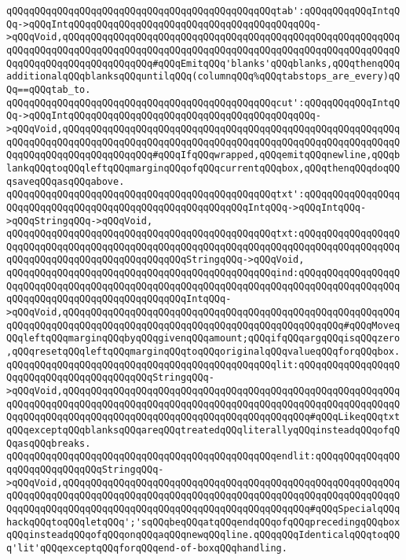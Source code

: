 \newline
\verb|qQQqqQQqqQQqqQQqqQQqqQQqqQQqqQQqqQQqqQQqqQQqqQQqtab':qQQqqQQqqQQqIntqQQq->qQQqIntqQQqqQQqqQQqqQQqqQQqqQQqqQQqqQQqqQQqqQQqqQQq->qQQqVoid,qQQqqQQqqQQqqQQqqQQqqQQqqQQqqQQqqQQqqQQqqQQqqQQqqQQqqQQqqQQqqQQqqQQqqQQqqQQqqQQqqQQqqQQqqQQqqQQqqQQqqQQqqQQqqQQqqQQqqQQqqQQqqQQqqQQqqQQqqQQqqQQqqQQqqQQqqQQq#qQQqEmitqQQq'blanks'qQQqblanks,qQQqthenqQQqadditionalqQQqblanksqQQquntilqQQq(columnqQQq%qQQqtabstops_are_every)qQQq==qQQqtab_to.|\newline
\verb|qQQqqQQqqQQqqQQqqQQqqQQqqQQqqQQqqQQqqQQqqQQqqQQqcut':qQQqqQQqqQQqIntqQQq->qQQqIntqQQqqQQqqQQqqQQqqQQqqQQqqQQqqQQqqQQqqQQqqQQq->qQQqVoid,qQQqqQQqqQQqqQQqqQQqqQQqqQQqqQQqqQQqqQQqqQQqqQQqqQQqqQQqqQQqqQQqqQQqqQQqqQQqqQQqqQQqqQQqqQQqqQQqqQQqqQQqqQQqqQQqqQQqqQQqqQQqqQQqqQQqqQQqqQQqqQQqqQQqqQQqqQQq#qQQqIfqQQqwrapped,qQQqemitqQQqnewline,qQQqblankqQQqtoqQQqleftqQQqmarginqQQqofqQQqcurrentqQQqbox,qQQqthenqQQqdoqQQqsaveqQQqasqQQqabove.|\newline
\newline
\verb|qQQqqQQqqQQqqQQqqQQqqQQqqQQqqQQqqQQqqQQqqQQqqQQqtxt':qQQqqQQqqQQqqQQqqQQqqQQqqQQqqQQqqQQqqQQqqQQqqQQqqQQqqQQqqQQqIntqQQq->qQQqIntqQQq->qQQqStringqQQq->qQQqVoid,|\newline
\verb|qQQqqQQqqQQqqQQqqQQqqQQqqQQqqQQqqQQqqQQqqQQqqQQqtxt:qQQqqQQqqQQqqQQqqQQqqQQqqQQqqQQqqQQqqQQqqQQqqQQqqQQqqQQqqQQqqQQqqQQqqQQqqQQqqQQqqQQqqQQqqQQqqQQqqQQqqQQqqQQqqQQqqQQqqQQqStringqQQq->qQQqVoid,|\newline
\newline
\verb|qQQqqQQqqQQqqQQqqQQqqQQqqQQqqQQqqQQqqQQqqQQqqQQqind:qQQqqQQqqQQqqQQqqQQqqQQqqQQqqQQqqQQqqQQqqQQqqQQqqQQqqQQqqQQqqQQqqQQqqQQqqQQqqQQqqQQqqQQqqQQqqQQqqQQqqQQqqQQqqQQqqQQqqQQqIntqQQq->qQQqVoid,qQQqqQQqqQQqqQQqqQQqqQQqqQQqqQQqqQQqqQQqqQQqqQQqqQQqqQQqqQQqqQQqqQQqqQQqqQQqqQQqqQQqqQQqqQQqqQQqqQQqqQQqqQQqqQQqqQQqqQQq#qQQqMoveqQQqleftqQQqmarginqQQqbyqQQqgivenqQQqamount;qQQqifqQQqargqQQqisqQQqzero,qQQqresetqQQqleftqQQqmarginqQQqtoqQQqoriginalqQQqvalueqQQqforqQQqbox.|\newline
\newline
\verb|qQQqqQQqqQQqqQQqqQQqqQQqqQQqqQQqqQQqqQQqqQQqqQQqlit:qQQqqQQqqQQqqQQqqQQqqQQqqQQqqQQqqQQqqQQqqQQqStringqQQq->qQQqVoid,qQQqqQQqqQQqqQQqqQQqqQQqqQQqqQQqqQQqqQQqqQQqqQQqqQQqqQQqqQQqqQQqqQQqqQQqqQQqqQQqqQQqqQQqqQQqqQQqqQQqqQQqqQQqqQQqqQQqqQQqqQQqqQQqqQQqqQQqqQQqqQQqqQQqqQQqqQQqqQQqqQQqqQQqqQQqqQQqqQQqqQQq#qQQqLikeqQQqtxtqQQqexceptqQQqblanksqQQqareqQQqtreatedqQQqliterallyqQQqinsteadqQQqofqQQqasqQQqbreaks.|\newline
\verb|qQQqqQQqqQQqqQQqqQQqqQQqqQQqqQQqqQQqqQQqqQQqqQQqendlit:qQQqqQQqqQQqqQQqqQQqqQQqqQQqqQQqStringqQQq->qQQqVoid,qQQqqQQqqQQqqQQqqQQqqQQqqQQqqQQqqQQqqQQqqQQqqQQqqQQqqQQqqQQqqQQqqQQqqQQqqQQqqQQqqQQqqQQqqQQqqQQqqQQqqQQqqQQqqQQqqQQqqQQqqQQqqQQqqQQqqQQqqQQqqQQqqQQqqQQqqQQqqQQqqQQqqQQqqQQqqQQqqQQqqQQq#qQQqSpecialqQQqhackqQQqtoqQQqletqQQq';'sqQQqbeqQQqatqQQqendqQQqofqQQqprecedingqQQqboxqQQqinsteadqQQqofqQQqonqQQqaqQQqnewqQQqline.qQQqqQQqIdenticalqQQqtoqQQq'lit'qQQqexceptqQQqforqQQqend-of-boxqQQqhandling.|\newline
